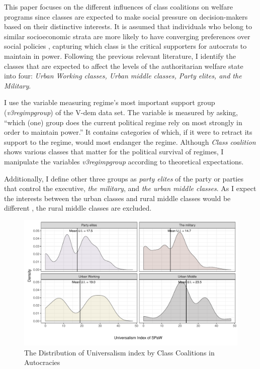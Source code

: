 \documentclass[12pt, letterpage, notitlepage]{article}
\begin{document}
This paper focuses on the different influences of class coalitions on welfare programs since classes are expected to make social pressure on decision-makers based on their distinctive interests. It is assumed that individuals who belong to similar socioeconomic strata are more likely to have converging preferences over social policies \citep[1495]{Dahlum2019}, capturing which class is the critical supporters for autocrats to maintain in power. Following the previous relevant literature, I identify the classes that are expected to affect the levels of the authoritarian welfare state into four: \textit{Urban Working classes, Urban middle classes, Party elites, and the Military}.

I use the variable measuring regime's most important support group (\textit{v3regimpgroup}) of the V-dem data set. The variable is measured by asking, ``which (one) group does the current political regime rely on most strongly in order to maintain power.'' It contains categories of which, if it were to retract its support to the regime, would most endanger the regime. Although \textit{Class coalition} shows various classes that matter for the political survival of regimes, I manipulate the variables \textit{v3regimpgroup} according to theoretical expectations. 

Additionally, I define other three groups as \textit{party elites} of the party or parties that control the executive, \textit{the military}, and \textit{the urban middle classes}. As I expect the interests between the urban classes and rural middle classes would be different \citep{Dahlum2019}, the rural middle classes are excluded.

\begin{figure}[!htbt]
	\centering
	\includegraphics[width=1\linewidth]{"2_Figures/Plot2"}
	\caption{The Distribution of Universalism index by Class Coalitions in Autocracies}
	\label{fig:plot3}
\end{figure}
\end{document}
